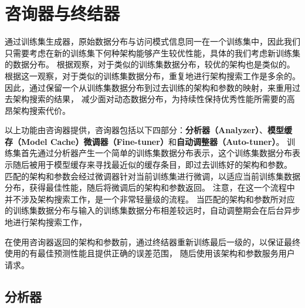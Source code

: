 \section{咨询器与终结器}

通过训练集生成器，原始数据分布与访问模式信息同一在一个训练集中，因此我们只需要考虑在新的训练集下何种{\rmi}架构能够产生较优性能，具体的我们考虑新训练集的数据分布。
根据观察，对于类似的训练集数据分布，较优的{\rmi}架构也是类似的。
根据这一观察，对于类似的训练集数据分布，重复地进行架构搜索工作是多余的。
因此，{\sys}通过保留一个从训练集数据分布到过去训练的{\rmi}架构和参数的映射，来重用过去{\rmi}架构搜索的结果，
减少面对动态数据分布，为持续性保持{\li}优秀性能所需要的高昂架构搜索代价。


以上功能由咨询器提供，咨询器包括以下四部分：\textbf{分析器（Analyzer）}、\textbf{模型缓存（Model Cache）}\textbf{微调器（Fine-tuner）}和\textbf{自动调整器（Auto-tuner）}。
训练集首先通过分析器产生一个简单的训练集数据分布表示，这个训练集数据分布表示随后被用于模型缓存来寻找最近似的缓存条目，即过去训练好的{\rmi}架构和参数。
匹配的{\rmi}架构和参数会经过微调器针对当前训练集进行微调，以适应当前训练集数据分布，获得最佳性能，随后将微调后的{\rmi}架构和参数返回。
注意，在这一个流程中并不涉及架构搜索工作，是一个非常轻量级的流程。
当匹配的{\rmi}架构和参数所对应的训练集数据分布与输入的训练集数据分布相差较远时，自动调整期会在后台异步地进行架构搜索工作，


在使用咨询器返回的{\rmi}架构和参数前，{\sys}通过终结器重新训练{\rmi}最后一级的{\model}，以保证最终使用的{\rmi}有最佳预测性能且提供正确的误差范围，
随后{\sys}使用该{\rmi}架构和参数服务用户请求。

\subsection{分析器}

